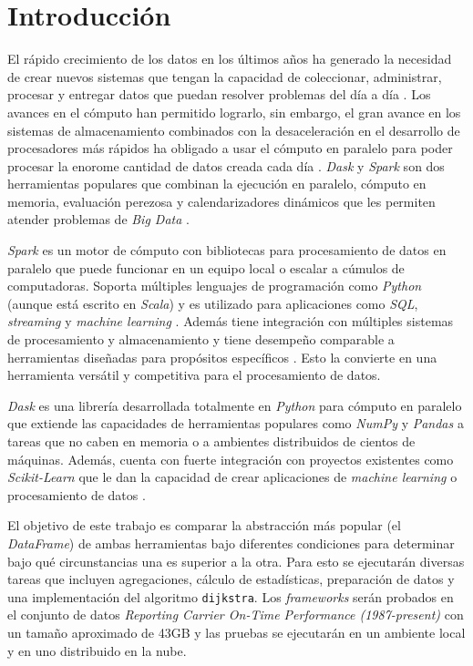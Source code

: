 \chapter*{Introducción}


\noindent El rápido crecimiento de los datos en los últimos años ha generado la necesidad de crear nuevos sistemas que tengan la capacidad de coleccionar, administrar, procesar y entregar datos que puedan resolver problemas del día a día \cite{seagate}. Los avances en el cómputo han permitido lograrlo, sin embargo, el gran avance en los sistemas de almacenamiento combinados con la desaceleración en el desarrollo de procesadores más rápidos ha obligado a usar el cómputo en paralelo para poder procesar la enorome cantidad de datos creada cada día \cite{sparkguide}. \textit{Dask} y \textit{Spark} son dos herramientas populares que combinan la ejecución en paralelo, cómputo en memoria, evaluación perezosa y calendarizadores dinámicos que les permiten atender problemas de \textit{Big Data} \cite{dask-spark-neuroimaging}.

\textit{Spark} es un motor de cómputo con bibliotecas para procesamiento de datos en paralelo que puede funcionar en un equipo local o escalar a cúmulos de computadoras. Soporta múltiples lenguajes de programación como \textit{Python} (aunque está escrito en \textit{Scala}) y es utilizado para aplicaciones como \textit{SQL}, \textit{streaming} y \textit{machine learning} \cite{sparkguide}. Además tiene integración con múltiples sistemas de procesamiento y almacenamiento y tiene desempeño comparable a herramientas diseñadas para propósitos específicos \cite{sparkberkeley}. Esto la convierte en una herramienta versátil y competitiva para el procesamiento de datos. 

\textit{Dask} es una librería desarrollada totalmente en \textit{Python} para cómputo en paralelo que extiende las capacidades de herramientas populares como \textit{NumPy} y \textit{Pandas} a tareas que no caben en memoria o a ambientes distribuidos de cientos de máquinas. Además, cuenta con fuerte integración con proyectos existentes como \textit{Scikit-Learn} que le dan la capacidad de crear aplicaciones de \textit{machine learning} o procesamiento de datos \cite{daskdocs}.

El objetivo de este trabajo es comparar la abstracción más popular (el \textit{DataFrame}) de ambas herramientas bajo diferentes condiciones para determinar bajo qué circunstancias una es superior a la otra. Para esto se ejecutarán diversas tareas que incluyen agregaciones, cálculo de estadísticas, preparación de datos y una implementación del algoritmo \texttt{dijkstra}. Los \textit{frameworks} serán probados en el conjunto de datos \textit{Reporting Carrier On-Time Performance (1987-present)} con un tamaño aproximado de 43GB y las pruebas se ejecutarán en un ambiente local y en uno distribuido en la nube.

